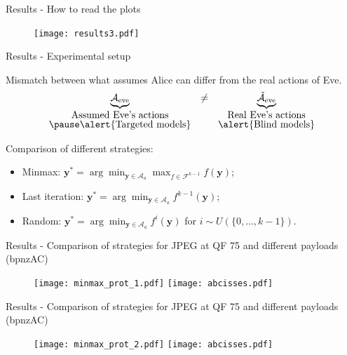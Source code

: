 \documentclass[10pt,aspectratio=169]{beamer}
\newcommand{\fset}{\mathcal{F}}
\begin{document}
\begin{frame}{Results - How to read the plots }
    \begin{figure}
        \texttt{[image: results3.pdf]}
    \end{figure}
\end{frame}

\begin{frame}{Results - Experimental setup}
    
    Mismatch between what assumes Alice can differ from the real actions of Eve. 
    \begin{equation*}
        \begin{array}{ccc}
            \underbrace{\mathcal{A}_{\text{eve}}}_{\mbox{Assumed Eve's actions}} & \neq & \underbrace{\tilde{\mathcal{A}}_{\text{eve}}}_{\mbox{Real Eve's actions}} \\
            \pause \alert{\mbox{Targeted models}} & & \alert{\mbox{Blind models}}
        \end{array}
    \end{equation*}
    
    \pause
    Comparison of different strategies: 
    \begin{itemize}
        \item  Minmax: $\mathbf{y}^\ast = \arg \min_{\mathbf{y} \in \mathcal{A}_a} \max_{f \in \fset^{k-1}} f(\mathbf{y})$;
        \item  Last iteration: $\mathbf{y}^\ast = \arg \min_{\mathbf{y} \in \mathcal{A}_a}  f^{k-1}(\mathbf{y})$;
        \item  Random: $\mathbf{y}^\ast = \arg \min_{\mathbf{y} \in \mathcal{A}_a}  f^i(\mathbf{y})$ for $i\sim U(\{0,\dots,k-1\})$. 
    \end{itemize}

\end{frame}


\begin{frame}{Results - Comparison of strategies for JPEG at QF 75 and different payloads (bpnzAC)}
    \begin{figure}
        \texttt{[image: minmax\_prot\_1.pdf]}
        \texttt{[image: abcisses.pdf]}
    \end{figure}
\end{frame}

\begin{frame}{Results - Comparison of strategies for JPEG at QF 75 and different payloads (bpnzAC)}
    \begin{figure}
        \texttt{[image: minmax\_prot\_2.pdf]}
        \texttt{[image: abcisses.pdf]}
    \end{figure}
\end{frame}
\end{document}
